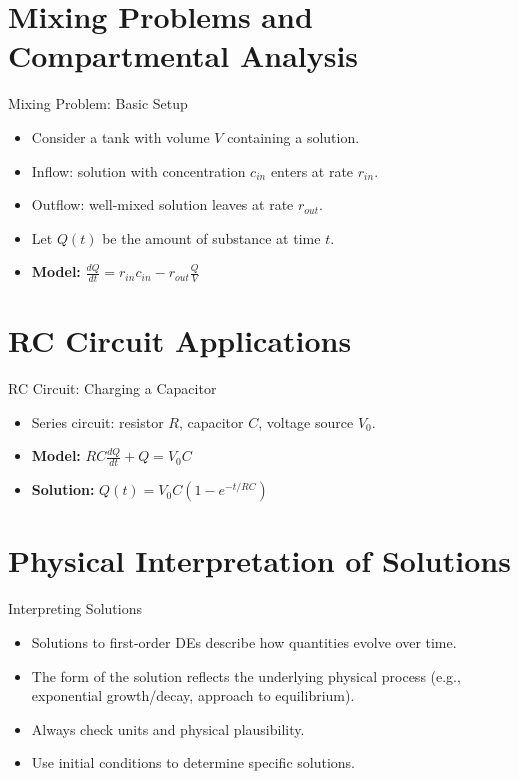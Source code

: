 \documentclass[10pt,aspectratio=169]{beamer}
\begin{document}
\section{Mixing Problems and Compartmental Analysis}
\begin{frame}{Mixing Problem: Basic Setup}
    \begin{itemize}
        \item Consider a tank with volume $V$ containing a solution.
        \item Inflow: solution with concentration $c_{in}$ enters at rate $r_{in}$.
        \item Outflow: well-mixed solution leaves at rate $r_{out}$.
        \item Let $Q(t)$ be the amount of substance at time $t$.
        \item \textbf{Model:} $\frac{dQ}{dt} = r_{in}c_{in} - r_{out}\frac{Q}{V}$
    \end{itemize}
\end{frame}

\section{RC Circuit Applications}
\begin{frame}{RC Circuit: Charging a Capacitor}
    \begin{itemize}
        \item Series circuit: resistor $R$, capacitor $C$, voltage source $V_0$.
        \item \textbf{Model:} $RC\frac{dQ}{dt} + Q = V_0C$
        \item \textbf{Solution:} $Q(t) = V_0C(1 - e^{-t/RC})$
    \end{itemize}
\end{frame}

\section{Physical Interpretation of Solutions}
\begin{frame}{Interpreting Solutions}
    \begin{itemize}
        \item Solutions to first-order DEs describe how quantities evolve over time.
        \item The form of the solution reflects the underlying physical process (e.g., exponential growth/decay, approach to equilibrium).
        \item Always check units and physical plausibility.
        \item Use initial conditions to determine specific solutions.
    \end{itemize}
\end{frame}
\end{document}
